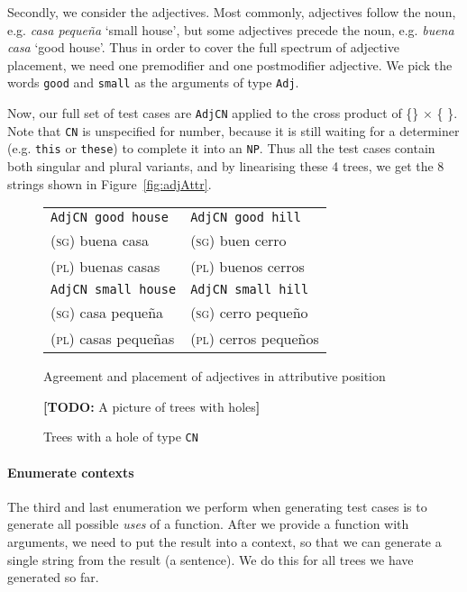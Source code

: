 \documentclass[11pt]{article}
\def\t#1{\texttt{#1}}
\newcommand{\todo}[1]{{\color{cyan}\textbf{[TODO: }#1\textbf{]}}}
\begin{document}
Secondly, we consider the adjectives. Most commonly, adjectives follow
the noun, e.g. \emph{casa peque\~{n}a} `small house', but some
adjectives precede the noun, e.g. \emph{buena casa} `good house'. Thus 
in order to cover the full spectrum of adjective placement, we need
one premodifier and one postmodifier adjective. We pick the words
\t{good} and \t{small} as the arguments of type \t{Adj}. 

Now, our full set of test cases are \t{AdjCN} applied to the cross
product of \{\}
$\times$ \{ \}.
Note that \t{CN} is unspecified for number, because it is still waiting for a
determiner (e.g. \t{this} or \t{these}) to complete it into an
\t{NP}. Thus all the test cases contain both singular and plural
variants, and by linearising these 4 trees, we get the 8 strings shown
in Figure~\ref{fig:adjAttr}.

\begin{figure}
\centering
\begin{minipage}{.5\textwidth}
\centering
\begin{tabular}{| l | l |}
\hline
\t{AdjCN good house}   & \t{AdjCN good hill} \\ 
\textsc{(sg)} buena casa             & \textsc{(sg)} buen cerro \\
\textsc{(pl)} buenas casas           & \textsc{(pl)} buenos cerros \\ \hline

\t{AdjCN small house}   & \t{AdjCN small hill} \\ 
\textsc{(sg)} casa  peque\~{n}a            & \textsc{(sg)} cerro  peque\~{n}o \\
\textsc{(pl)} casas  peque\~{n}as          & \textsc{(pl)} cerros  peque\~{n}os \\ \hline
\end{tabular}
\caption{Agreement and placement of adjectives in attributive position}
\label{fig:adjAttr}
\end{minipage}%
\begin{minipage}{.5\textwidth}
  \centering
  \todo{A picture of trees with holes}
 \caption{Trees with a hole of type \t{CN}}
\label{fig:treesWithHoles}
\end{minipage}
\end{figure}

\paragraph{Enumerate contexts} The third and last enumeration we perform when generating test cases is to generate all possible \emph{uses} of a function. After we provide a function with arguments, we need to put the result into a context, so that we can generate a single string from the result (a sentence). We do this for all trees we have generated so far.
\end{document}
